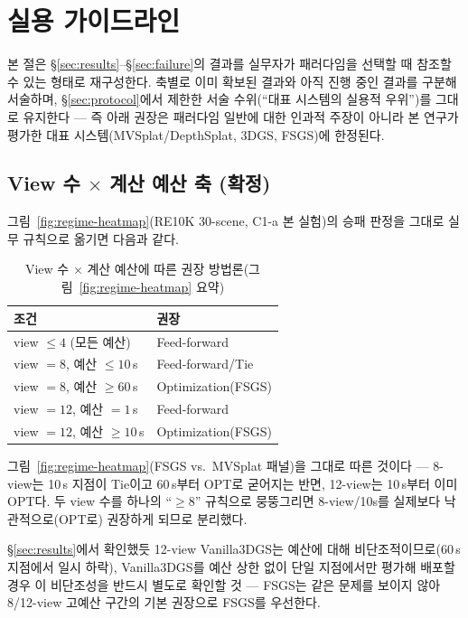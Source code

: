 \section{실용 가이드라인}
\label{sec:guideline}

본 절은 \S\ref{sec:results}--\S\ref{sec:failure}의 결과를 실무자가 패러다임을 선택할 때 참조할 수 있는 형태로 재구성한다. 축별로 이미 확보된 결과와 아직 진행 중인 결과를 구분해 서술하며, \S\ref{sec:protocol}에서 제한한 서술 수위(``대표 시스템의 실용적 우위'')를 그대로 유지한다 — 즉 아래 권장은 패러다임 일반에 대한 인과적 주장이 아니라 본 연구가 평가한 대표 시스템(MVSplat/DepthSplat, 3DGS, FSGS)에 한정된다.

\subsection{View 수 $\times$ 계산 예산 축 (확정)}
\label{sec:guideline-view-budget}

그림~\ref{fig:regime-heatmap}(RE10K 30-scene, C1-a 본 실험)의 승패 판정을 그대로 실무 규칙으로 옮기면 다음과 같다.

\begin{table}[h]
\centering
\caption{View 수 $\times$ 계산 예산에 따른 권장 방법론(그림~\ref{fig:regime-heatmap} 요약)}
\label{tab:guideline-view-budget}
\small
\begin{tabular}{@{}L{4.3cm} L{2.7cm}@{}}
\toprule
조건 & 권장 \\
\midrule
view $\le 4$ (모든 예산) & Feed-forward \\
view $= 8$, 예산 $\le 10$\,s & Feed-forward/Tie \\
view $= 8$, 예산 $\ge 60$\,s & Optimization(FSGS) \\
view $= 12$, 예산 $= 1$\,s & Feed-forward \\
view $= 12$, 예산 $\ge 10$\,s & Optimization(FSGS) \\
\bottomrule
\end{tabular}
\end{table}

그림~\ref{fig:regime-heatmap}(FSGS vs.\ MVSplat 패널)을 그대로 따른 것이다 — 8-view는 10\,s 지점이 Tie이고 60\,s부터 OPT로 굳어지는 반면, 12-view는 10\,s부터 이미 OPT다. 두 view 수를 하나의 ``$\ge 8$'' 규칙으로 뭉뚱그리면 8-view/10s를 실제보다 낙관적으로(OPT로) 권장하게 되므로 분리했다.

\S\ref{sec:results}에서 확인했듯 12-view Vanilla3DGS는 예산에 대해 비단조적이므로(60\,s 지점에서 일시 하락), Vanilla3DGS를 예산 상한 없이 단일 지점에서만 평가해 배포할 경우 이 비단조성을 반드시 별도로 확인할 것 — FSGS는 같은 문제를 보이지 않아 8/12-view 고예산 구간의 기본 권장으로 FSGS를 우선한다.

